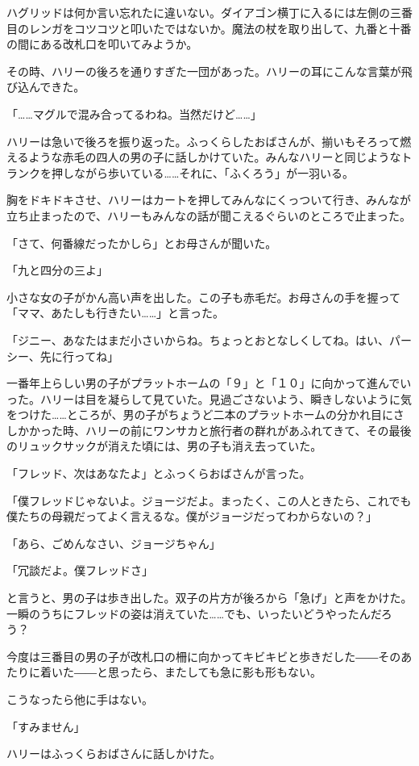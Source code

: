 \documentclass[10pt,a4paper]{article}
\begin{document}
\begin{CJK}{UTF8}{min}
ハグリッドは何か言い忘れたに違いない。ダイアゴン横丁に入るには左側の三番目のレンガをコツコツと叩いたではないか。魔法の杖を取り出して、九番と十番の間にある改札口を叩いてみようか。

その時、ハリーの後ろを通りすぎた一団があった。ハリーの耳にこんな言葉が飛び込んできた。

「……マグルで混み合ってるわね。当然だけど……」

ハリーは急いで後ろを振り返った。ふっくらしたおばさんが、揃いもそろって燃えるような赤毛の四人の男の子に話しかけていた。みんなハリーと同じようなトランクを押しながら歩いている……それに、「ふくろう」が一羽いる。

胸をドキドキさせ、ハリーはカートを押してみんなにくっついて行き、みんなが立ち止まったので、ハリーもみんなの話が聞こえるぐらいのところで止まった。

「さて、何番線だったかしら」とお母さんが聞いた。

「九と四分の三よ」

小さな女の子がかん高い声を出した。この子も赤毛だ。お母さんの手を握って「ママ、あたしも行きたい……」と言った。

「ジニー、あなたはまだ小さいからね。ちょっとおとなしくしてね。はい、パーシー、先に行ってね」

一番年上らしい男の子がプラットホームの「９」と「１０」に向かって進んでいった。ハリーは目を凝らして見ていた。見過ごさないよう、瞬きしないように気をつけた……ところが、男の子がちょうど二本のプラットホームの分かれ目にさしかかった時、ハリーの前にワンサカと旅行者の群れがあふれてきて、その最後のリュックサックが消えた頃には、男の子も消え去っていた。

「フレッド、次はあなたよ」とふっくらおばさんが言った。

「僕フレッドじゃないよ。ジョージだよ。まったく、この人ときたら、これでも僕たちの母親だってよく言えるな。僕がジョージだってわからないの？」

「あら、ごめんなさい、ジョージちゃん」

「冗談だよ。僕フレッドさ」

と言うと、男の子は歩き出した。双子の片方が後ろから「急げ」と声をかけた。一瞬のうちにフレッドの姿は消えていた……でも、いったいどうやったんだろう？

今度は三番目の男の子が改札口の柵に向かってキビキビと歩きだした――そのあたりに着いた――と思ったら、またしても急に影も形もない。

こうなったら他に手はない。

「すみません」

ハリーはふっくらおばさんに話しかけた。


\end{CJK}
\end{document}
